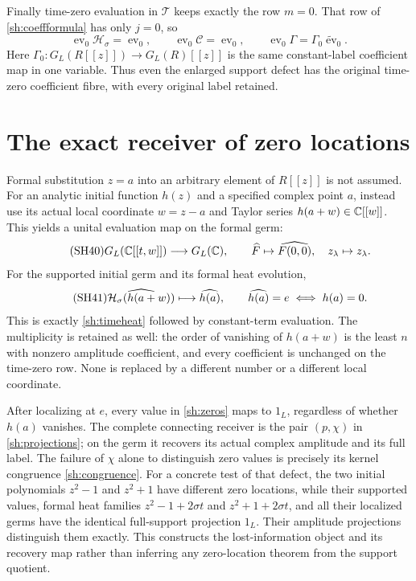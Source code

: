 Finally time-zero evaluation in $\mathscr T$ keeps exactly
the row $m=0$. That row of \eqref{sh:coeffformula} has only
$j=0$, so
\begin{equation}\tag{SH39}\label{sh:coefftimezero}
 \operatorname{ev}_0\mathscr H_\sigma
   =\operatorname{ev}_0,\qquad
 \operatorname{ev}_0\mathscr C=\operatorname{ev}_0,\qquad
 \operatorname{ev}_0\Gamma
   =\Gamma_0\widetilde{\operatorname{ev}}_0.
\end{equation}
Here $\Gamma_0:G_L(R[[z]])\to G_L(R)[[z]]$ is the
same constant-label coefficient map in one variable.
Thus even the enlarged support defect has the original
time-zero coefficient fibre, with every original label retained.

\section{The exact receiver of zero locations}

Formal substitution $z=a$ into an arbitrary element of $R[[z]]$
is not assumed. For an analytic initial function $h(z)$ and a
specified complex point $a$, instead use its actual local
coordinate $w=z-a$ and Taylor series
$h(a+w)\in\mathbb C[[w]]$. This yields a unital evaluation map
on the formal germ:
\begin{equation}\tag{SH40}\label{sh:zeroreceiver}
 G_L(\mathbb C[[t,w]])\longrightarrow G_L(\mathbb C),\qquad
 \widehat F\mapsto\widehat{F(0,0)},\quad
 z_\lambda\mapsto z_\lambda.
\end{equation}
For the supported initial germ and its formal heat evolution,
\begin{equation}\tag{SH41}\label{sh:zeros}
 \widehat{\mathcal H_\sigma(h(a+w))}\longmapsto\widehat{h(a)},\qquad
 \widehat{h(a)}=e\iff h(a)=0 .
\end{equation}
This is exactly \eqref{sh:timeheat} followed by constant-term
evaluation. The multiplicity is retained as well: the order of
vanishing of $h(a+w)$ is the least $n$ with nonzero amplitude
coefficient, and every coefficient is unchanged on the
time-zero row. None is replaced by a different number or a
different local coordinate.

After localizing at $e$, every value in \eqref{sh:zeros} maps
to $1_L$, regardless of whether $h(a)$ vanishes. The complete
connecting receiver is the pair $(p,\chi)$ in
\eqref{sh:projections}; on the germ it recovers its actual
complex amplitude and its full label. The failure of $\chi$
alone to distinguish zero values is precisely its kernel
congruence \eqref{sh:congruence}. For a concrete test of that
defect, the two initial polynomials $z^2-1$ and $z^2+1$ have
different zero locations, while their supported values, formal
heat families $z^2-1+2\sigma t$ and $z^2+1+2\sigma t$, and
all their localized germs have the identical full-support
projection $1_L$. Their amplitude projections distinguish them
exactly. This constructs the lost-information object and its
recovery map rather than inferring any zero-location theorem
from the support quotient.

